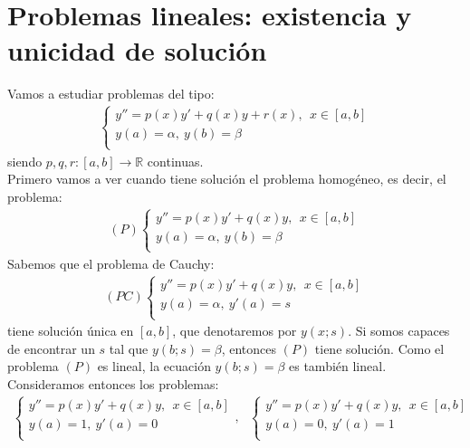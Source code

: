 \section{Problemas lineales: existencia y unicidad de solución}
\noindent Vamos a estudiar problemas del tipo:
\begin{align*}
    \left\{ \begin{array}{lcc}
             y'' = p(x)y' + q(x)y + r(x), \ \ x \in [a,b]\\
             y(a) = \alpha, \ y(b) = \beta \\
             \end{array}
   \right.
\end{align*}
siendo $p,q,r :[a,b] \longrightarrow \mathbb{R}$ continuas.
\\
\newline
Primero vamos a ver cuando tiene solución el problema homogéneo, es decir, el problema:
\begin{align*}
    (P)\left\{ \begin{array}{lcc}
             y'' = p(x)y' + q(x)y, \ \ x \in [a,b]\\
             y(a) = \alpha, \ y(b) = \beta \\
             \end{array}
   \right.
\end{align*}
Sabemos que el problema de Cauchy:
\begin{align*}
    (PC)\left\{ \begin{array}{lcc}
             y'' = p(x)y' + q(x)y, \ \ x \in [a,b]\\
             y(a) = \alpha, \ y'(a) = s \\
             \end{array}
   \right.
\end{align*}
tiene solución única en $[a,b]$, que denotaremos por $y(x;s)$. Si somos capaces de encontrar un $s$ tal que $y(b;s) = \beta$, entonces $(P)$ tiene solución. Como el problema $(P)$ es lineal, la ecuación $y(b;s) = \beta$ es también lineal. Consideramos entonces los problemas:
\begin{align*}
    \left\{ \begin{array}{lcc}
             y'' = p(x)y' + q(x)y, \ \ x \in [a,b]\\
             y(a) = 1, \ y'(a) = 0 \\
             \end{array}
   \right., \ \ \ \left\{ \begin{array}{lcc}
             y'' = p(x)y' + q(x)y, \ \ x \in [a,b]\\
             y(a) = 0, \ y'(a) = 1 \\
             \end{array}
   \right.
\end{align*}
